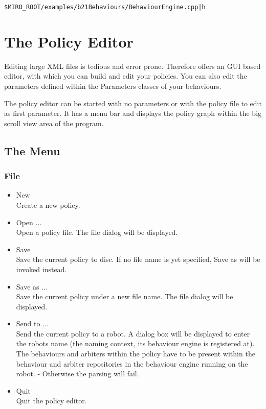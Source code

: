 {\tt \$MIRO\_ROOT/examples/b21Behaviours/BehaviourEngine.cpp|h}

\section{The Policy Editor}
\label{SEC:POLICY_EDITOR}

Editing large XML files is tedious and error prone. Therefore \miro
offers an GUI based editor, with which you can build and edit your
policies. You can also edit the parameters defined within the
Parameters classes of your behaviours.

The policy editor can be started with no parameters or with the policy
file to edit as first parameter. It has a menu bar and displays the
policy graph within the big scroll view area of the program.

\subsection{The Menu}

\subsubsection{File}
\begin{itemize}
\item New \\
  Create a new policy.
\item Open ... \\
  Open a policy file. The file dialog will be displayed.
\item Save \\
  Save the current policy to disc. If no file name is yet specified,
  Save as will be invoked instead.
\item Save as ... \\
  Save the current policy under a new file name. The file dialog will be
  displayed.
\item Send to ... \\
  Send the current policy to a robot. A dialog box will be displayed to
  enter the robots name (the naming context, its behaviour engine is
  registered at). The behaviours and arbiters within the policy have to
  be present within the behaviour and arbiter repositories in the
  behaviour engine running on the robot. - Otherwise the parsing will
  fail.
\item Quit \\
  Quit the policy editor.
\end{itemize}
